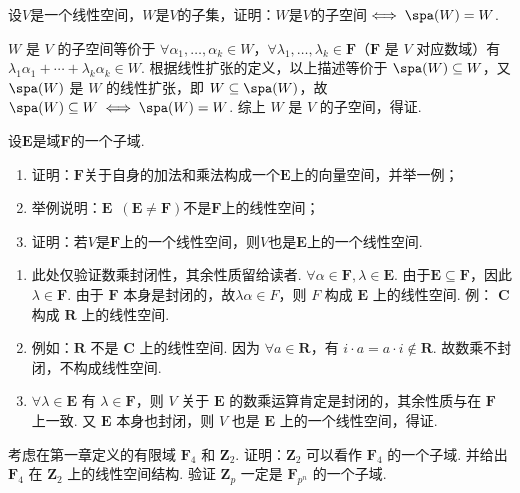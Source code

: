 \begin{exercise}
\begin{exgroup}
\begin{answer}
        \end{answer}

        \item 设$V$是一个线性空间，$W$是$V$的子集，证明：$W$是$V$的子空间$\iff \spa(W)=W$.
        \begin{answer}
            $W$ 是 $V$ 的子空间等价于 $\forall \alpha_1,\ldots,\alpha_k\in W$，$\forall \lambda_1,\ldots,\lambda_k\in \mathbf{F}$（$\mathbf{F}$ 是 $V$ 对应数域）有 $\lambda_1\alpha_1+\cdots+\lambda_k\alpha_k\in W$. 根据线性扩张的定义，以上描述等价于 $\spa(W)\subseteq W$，又 $\spa(W)$ 是 $W$ 的线性扩张，即 $W\subseteq\spa(W)$，故$\spa(W)\subseteq W \iff \spa(W)=W$. 综上 $W$ 是 $V$ 的子空间，得证.
        \end{answer}
    \end{exgroup}

    \begin{exgroup}
        \item 设$\mathbf{E}$是域$\mathbf{F}$的一个子域.
        \begin{enumerate}
            \item 证明：$\mathbf{F}$关于自身的加法和乘法构成一个$\mathbf{E}$上的向量空间，并举一例；

            \item 举例说明：$\mathbf{E}\enspace(\mathbf{E}\neq \mathbf{F})$不是$\mathbf{F}$上的线性空间；

            \item 证明：若$V$是$\mathbf{F}$上的一个线性空间，则$V$也是$\mathbf{E}$上的一个线性空间.
        \end{enumerate}
        \begin{answer}
            \begin{enumerate}
                \item 此处仅验证数乘封闭性，其余性质留给读者. $\forall \alpha\in \mathbf{F},\lambda\in \mathbf{E}$. 由于$\mathbf{E}\subseteq \mathbf{F}$，因此$\lambda\in \mathbf{F}$. 由于 $\mathbf{F}$ 本身是封闭的，故$\lambda\alpha\in F$，则 $F$ 构成 $\mathbf{E}$ 上的线性空间. 例： $\mathbf{C}$ 构成 $\mathbf{R}$ 上的线性空间.

                \item 例如：$\mathbf{R}$ 不是 $\mathbf{C}$ 上的线性空间. 因为 $\forall a\in\mathbf{R}$，有 $i\cdot a=a\cdot i\not\in\mathbf{R}$. 故数乘不封闭，不构成线性空间.

                \item $\forall\lambda\in \mathbf{E}$ 有 $\lambda\in \mathbf{F}$，则 $V$ 关于 $\mathbf{E}$ 的数乘运算肯定是封闭的，其余性质与在 $\mathbf{F}$ 上一致. 又 $\mathbf{E}$ 本身也封闭，则 $V$ 也是 $\mathbf{E}$ 上的一个线性空间，得证.
            \end{enumerate}
        \end{answer}

        \item 考虑在第一章定义的有限域 $\mathbf{F}_4$ 和 $\mathbf{Z}_2$. 证明：$\mathbf{Z}_2$ 可以看作 $\mathbf{F}_4$ 的一个子域. 并给出 $\mathbf{F}_4$ 在 $\mathbf{Z}_2$ 上的线性空间结构. 验证 $\mathbf{Z}_p$ 一定是 $\mathbf{F}_{p^n}$ 的一个子域.
    \end{exgroup}
\end{exercise}
